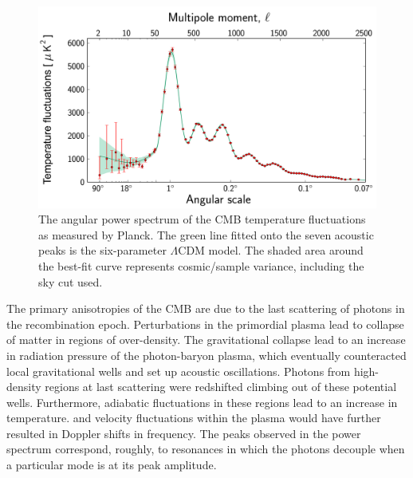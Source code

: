 \begin{figure}[ht!]
    \begin{center}
        \includegraphics[scale=0.15]{Chapter_1/Figures/Planck_power_spectrum.jpg}
        \caption[The map of the all sky CMB radiation as illustrated by the Planck collaboration, showing in detail the temperature anisotropies.]%
        {The angular power spectrum of the CMB temperature fluctuations as measured by Planck. The green line fitted onto the seven acoustic peaks is the six-parameter $\Lambda$CDM model. The shaded area around the best-fit curve represents cosmic/sample variance, including the sky cut used.}
        \label{fig:cmb_power_spectrum}
        \end{center}
\end{figure}

The primary anisotropies of the CMB are due to the last scattering of photons in the recombination epoch. Perturbations in the primordial plasma lead to collapse of matter in regions of over-density. The gravitational collapse lead to an increase in radiation pressure of the photon-baryon plasma, which eventually counteracted local gravitational wells and set up acoustic oscillations. Photons from high-density regions at last scattering were redshifted climbing out of these potential wells. Furthermore, adiabatic fluctuations in these regions lead to an increase in temperature. and velocity fluctuations within the plasma would have further resulted in Doppler shifts in frequency. The peaks observed in the power spectrum correspond, roughly, to resonances in which the photons decouple when a particular mode is at its peak amplitude.

